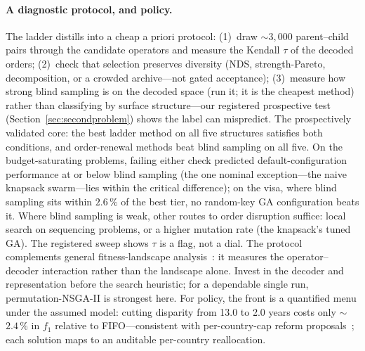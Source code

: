 \documentclass[runningheads]{llncs}
\begin{document}
\paragraph{A diagnostic protocol, and policy.}
The ladder distills into a cheap a priori protocol: (1)~draw ${\sim}3{,}000$ parent--child pairs through the candidate operators and measure the Kendall $\tau$ of the decoded orders; (2)~check that selection preserves diversity (NDS, strength-Pareto, decomposition, or a crowded archive---not gated acceptance); (3)~measure how strong blind sampling is on the decoded space (run it; it is the cheapest method) rather than classifying by surface structure---our registered prospective test (Section~\ref{sec:secondproblem}) shows the label can mispredict. The prospectively validated core: the best ladder method on all five structures satisfies both conditions, and order-renewal methods beat blind sampling on all five. On the budget-saturating problems, failing either check predicted default-configuration performance at or below blind sampling (the one nominal exception---the naive knapsack swarm---lies within the critical difference); on the visa, where blind sampling sits within $2.6\,\%$ of the best tier, no random-key GA configuration beats it. Where blind sampling is weak, other routes to order disruption suffice: local search on sequencing problems, or a higher mutation rate (the knapsack's tuned GA). The registered sweep shows $\tau$ is a flag, not a dial. The protocol complements general fitness-landscape analysis~\cite{malan}: it measures the operator--decoder interaction rather than the landscape alone. Invest in the decoder and representation before the search heuristic; for a dependable single run, permutation-NSGA-II is strongest here. For policy, the front is a quantified menu under the assumed model: cutting disparity from 13.0 to 2.0 years costs only $\sim$$2.4\,\%$ in $f_1$ relative to FIFO---consistent with per-country-cap reform proposals~\cite{crs,fwd}; each solution maps to an auditable per-country reallocation.
\end{document}
